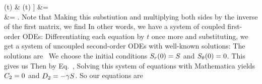 {{				\sin(\omg t) & \cos(\omg t)
			]  \mqty[ \Sr \\ \Stht ]
		&=  \mqty[ \Sr \\ \Stht ] \\
		&= \omg {} \mqty[ \Sr \\ \Stht ].
	}
	Note that
	Making this substiution and multiplying both sides by the inverse of the first matrix, we find
	In other words, we have a system of coupled first-order ODEs:
	Differentiating each equation by $t$ once more and substituting, we get a system of uncoupled second-order ODEs with well-known solutions:
	The solutions are~\cite[p.~207]{Swartz}
	We choose the initial conditions $S_r(0) = S$ and $S_\theta(0) = 0$.  This gives us
	Then by Eq.~,
	Solving this system of equations with Mathematica yields $C_2 = 0$ and $D_2 = -\gamma S$.  So our equations are
}
